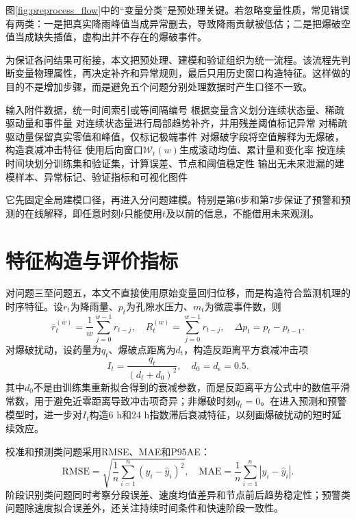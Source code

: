 图\ref{fig:preprocess_flow}中的“变量分类”是预处理关键。若忽略变量性质，常见错误有两类：一是把真实降雨峰值当成异常删去，导致降雨贡献被低估；二是把爆破空值当成缺失插值，虚构出并不存在的爆破事件。

为保证各问结果可衔接，本文把预处理、建模和验证组织为统一流程。该流程先判断变量物理属性，再决定补齐和异常规则，最后只用历史窗口构造特征。这样做的目的不是增加步骤，而是避免五个问题分别处理数据时产生口径不一致。

\begin{algorithm}[H]
\caption{统一数据处理与时间块验证流程}
\begin{algorithmic}[1]
\State 输入附件数据，统一时间索引或等间隔编号
\State 根据变量含义划分连续状态量、稀疏驱动量和事件量
\State 对连续状态量进行局部趋势补齐，并用残差阈值标记异常
\State 对稀疏驱动量保留真实零值和峰值，仅标记极端事件
\State 对爆破字段将空值解释为无爆破，构造衰减冲击特征
\State 使用后向窗口$\mathcal W_t(w)$生成滚动均值、累计量和变化率
\State 按连续时间块划分训练集和验证集，计算误差、节点和阈值稳定性
\State 输出无未来泄漏的建模样本、异常标记、验证指标和可视化图件
\end{algorithmic}
\end{algorithm}
它先固定全局建模口径，再进入分问题建模。特别是第6步和第7步保证了预警和预测的在线解释，即任意时刻$t$只能使用$t$及以前的信息，不能借用未来观测。

\section{特征构造与评价指标}

对问题三至问题五，本文不直接使用原始变量回归位移，而是构造符合监测机理的时序特征。设$r_t$为降雨量、$p_t$为孔隙水压力、$m_t$为微震事件数，则
\begin{equation}
  \bar r_t^{(w)}=\frac{1}{w}\sum_{j=0}^{w-1}r_{t-j},\quad
  R_t^{(w)}=\sum_{j=0}^{w-1}r_{t-j},\quad
  \Delta p_t=p_t-p_{t-1}.
\end{equation}
对爆破扰动，设药量为$q_t$、爆破点距离为$d_t$，构造反距离平方衰减冲击项
\begin{equation}
  I_t=\frac{q_t}{(d_t+d_0)^2},\quad d_0=d_\epsilon=0.5 .
\end{equation}
其中$d_0$不是由训练集重新拟合得到的衰减参数，而是反距离平方公式中的数值平滑常数，用于避免近零距离导致冲击项奇异；非爆破时刻$q_t=0$。在进入预测和预警模型时，进一步对$I_t$构造6 h和24 h指数滞后衰减特征，以刻画爆破扰动的短时延续效应。

校准和预测类问题采用RMSE、MAE和P95AE：
\begin{equation}
  \mathrm{RMSE}=\sqrt{\frac{1}{n}\sum_{i=1}^{n}(y_i-\hat y_i)^2},\quad
  \mathrm{MAE}=\frac{1}{n}\sum_{i=1}^{n}|y_i-\hat y_i|.
\end{equation}
阶段识别类问题同时考察分段误差、速度均值差异和节点前后趋势稳定性；预警类问题除速度拟合误差外，还关注持续时间条件和快速阶段一致性。
